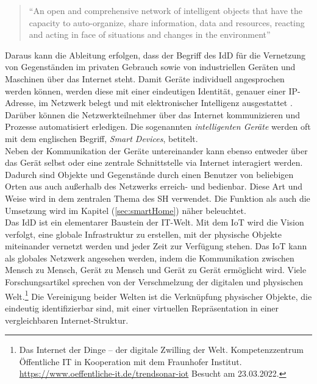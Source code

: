     \pagebreak
    \begin{quote}
        “An open and comprehensive network of intelligent objects that have the capacity to auto-organize, share information, data 
        and resources, reacting and acting in face of situations and changes in the environment” \cite{Madakam2015}
    \end{quote}
    Daraus kann die Ableitung erfolgen, dass der Begriff des \acl{IdD} für die Vernetzung von Gegenständen im privaten Gebrauch sowie 
    von industriellen Geräten und Maschinen über das Internet steht. Damit Geräte individuell angesprochen werden können, werden diese 
    mit einer eindeutigen Identität, genauer einer \ac{IP}-Adresse, im Netzwerk belegt und mit elektronischer Intelligenz ausgestattet \cite{bigdatainsider2016}.
    Darüber können die Netzwerkteilnehmer über das Internet kommunizieren und Prozesse automatisiert erledigen. Die sogenannten 
    \textit{intelligenten Geräte} werden oft mit dem englischen Begriff, \textit{Smart Devices}, betitelt. 
    \\
    \linebreak
    Neben der Kommunikation der Geräte untereinander kann ebenso entweder über das Gerät selbst oder eine zentrale 
    Schnittstelle via Internet interagiert werden. Dadurch sind Objekte und Gegenstände durch einen Benutzer von beliebigen Orten aus  
    auch außerhalb des Netzwerks erreich- und bedienbar. Diese Art und Weise wird in dem zentralen Thema des 
    \acl{SH} verwendet. Die Funktion als auch die Umsetzung wird im Kapitel (\ref{sec:smartHome}) näher beleuchtet.
    \\
    \linebreak
    Das \acl{IdD} ist ein elementarer Baustein der \acs{IT}-Welt. Mit dem \acs{IoT} wird die Vision verfolgt, eine globale 
    Infrastruktur zu erstellen, mit der physische Objekte miteinander vernetzt werden und jeder Zeit zur Verfügung stehen. Das \acl{IoT} 
    kann als globales Netzwerk angesehen werden, indem die Kommunikation zwischen Mensch zu Mensch, Gerät zu Mensch und Gerät zu 
    Gerät ermöglicht wird. Viele Forschungsartikel sprechen von der Verschmelzung der digitalen und 
    physischen Welt.\footnote{Das Internet der Dinge – der digitale Zwilling der Welt. Kompetenzzentrum Öffentliche IT in Kooperation mit dem Fraunhofer Institut. \url{https://www.oeffentliche-it.de/trendsonar-iot} Besucht am 23.03.2022.} 
    Die Vereinigung beider Welten ist die Verknüpfung physischer Objekte, die eindeutig identifizierbar sind, mit einer virtuellen 
    Repräsentation in einer vergleichbaren Internet-Struktur. 

